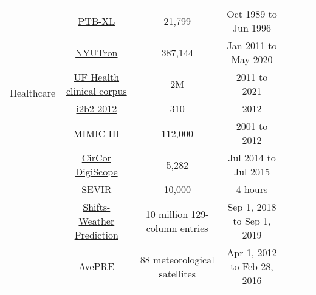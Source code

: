 \begin{table*}
{\begin{tabular}{c|cccccc}
	\midrule
	
	\multirow{6}{*}{Healthcare} 
	& \href{https://physionet.org/content/ptb-xl/1.0.3/}{PTB-XL} & 21,799 & Oct 1989 to Jun 1996 & 
        \cite{ptb-xl} & 
        \cite{strodthoff2020deep,mehari2022self,wang2021automated,hu2022transformer} 
        \\

        & \href{https://datacatalog.med.nyu.edu/dataset/10633}{NYUTron} & 387,144 & Jan 2011 to May 2020 & 
        \cite{jiang2023health} & \cite{imrie2023multiple,valizadeh2023automated,qi2023evaluating,han2023medical}
        \\
	& \href{https://catalog.ngc.nvidia.com/orgs/nvidia/teams/clara/models/gatortron_og}{UF Health clinical corpus} & 2M & 2011 to 2021 & \cite{yang2022large} 
        & \cite{thirunavukarasu2023large,moor2023foundation,qiu2023large} 
        \\
 
	& \href{https://www.i2b2.org/NLP/TemporalRelations/} 
        {i2b2-2012} & 310 & 2012 & \cite{i2b2} & \cite{wang2018clinical,lewis2020pretrained,henry20202018}
       \\

        & \href{https://physionet.org/content/mimiciii/1.4/}{MIMIC-III} & 112,000 & 2001 to 2012 & \cite{mimic} & \cite{peng2019transfer,zhang2022shifting,xu2021federated}
        \\

        & \href{https://physionet.org/content/circor-heart-sound/1.0.3/}{CirCor DigiScope} & 5,282 & Jul 2014 to Jul 2015 & \cite{9658215} & 
        \cite{reyna2022heart,fuadah2022optimal,ballas2022listen2yourheart}
        \\
        
        \midrule 
	
	\multirow{8}{*}{\makecell[c]{Weather}} 

        & \href{https://registry.opendata.aws/sevir/}{SEVIR} & 10,000 & 4 hours & \cite{veillette2020sevir} & \cite{seo2023implicit, gao2022earthformer} 
        \\
        
	& \href{https://github.com/Shifts-Project/shifts}{Shifts-Weather Prediction} & 10 million 129-column entries & Sep 1, 2018 to Sep 1, 2019  & \cite{shifts2021} & \cite{morelayers2021,Hammoudeh:2023:CertifiedRegression} 
        \\
        
	& \href{https://disc.gsfc.nasa.gov/}{AvePRE} & 88 meteorological satellites & Apr 1, 2012 to Feb 28, 2016 & \cite{chen2023spatialtemporal} &
        \cite{chen2023mask} 
        \\


\end{tabular}}
\end{table*}
